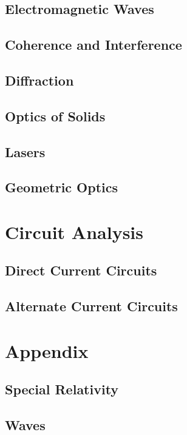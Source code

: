 \documentclass{book}
\begin{document}
\chapter{Electromagnetic Waves}

%
\chapter{Coherence and Interference}

\chapter{Diffraction}

\chapter{Optics of Solids}

\chapter{Lasers}

\chapter{Geometric Optics}

\part{Circuit Analysis}
\chapter{Direct Current Circuits}

\chapter{Alternate Current Circuits}

\part*{Appendix}
\appendix
%
\chapter{Special Relativity}

\chapter{Waves}

\nocite{griffem,jackson,landau2,zangwillem,fowles,fourieropt}
\printbibliography
\end{document}
